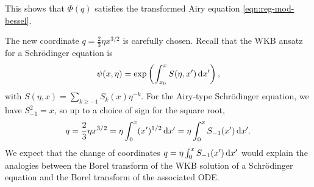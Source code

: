 \documentclass[10pt,a4paper]{amsart}
\numberwithin{equation}{section}
\begin{document}
This shows that $\Phi(q)$ satisfies the transformed Airy equation \eqref{eqn:reg-mod-bessel}.

\begin{Remark}
The new coordinate $q = \frac{2}{3}\eta x^{3/2}$ is carefully chosen. Recall that the WKB ansatz for a Schr\"{o}dinger equation is
\[
\psi(x,\eta) = \exp\left(\int_{x_0}^xS(\eta,x')\, {\rm d}x'\right),
\]
with $S(\eta,x)=\sum_{k\geq -1} S_k(x) \eta^{-k}$. For the Airy-type Schr\"odinger equation, we have $S_{-1}^2 = x$, so up to a choice of sign for the square root,
\[ q = \frac{2}{3}\eta x^{3/2}=\eta\int_0^x (x')^{1/2} \, {\rm d}x' = \eta\int_{0}^x S_{-1}(x')\, {\rm d}x'. \]
We expect that the change of coordinates $q=\eta\int_0^{x}S_{-1}(x') \,{\rm d}x'$ would explain the analogies between the Borel transform of the WKB solution of a Schr\"{o}dinger equation and the Borel transform of the associated ODE.
\end{Remark}
\end{document}
